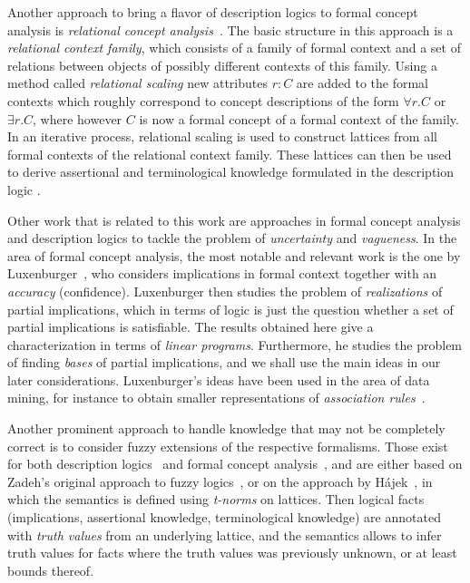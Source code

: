 Another approach to bring a flavor of description logics to formal concept analysis is
\emph{relational concept analysis}~\cite{conf/icfca/RouaneHNV07,
  journals/amai/HaceneHNV13}.  The basic structure in this approach is a \emph{relational
  context family}, which consists of a family of formal context and a set of relations
between objects of possibly different contexts of this family.  Using a method called
\emph{relational scaling} new attributes $r \colon C$ are added to the formal contexts
which roughly correspond to concept descriptions of the form $\forall r. C$ or $\exists
r. C$, where however $C$ is now a formal concept of a formal context of the family.  In an
iterative process, relational scaling is used to construct lattices from all formal
contexts of the relational context family.  These lattices can then be used to derive
assertional and terminological knowledge formulated in the description logic \FLE.

Other work that is related to this work are approaches in formal concept analysis and
description logics to tackle the problem of \emph{uncertainty} and \emph{vagueness}.  In
the area of formal concept analysis, the most notable and relevant work is the one by
Luxenburger~\cite{diss:Luxenburger,Luxenburger91}, who considers implications in formal
context together with an \emph{accuracy} (confidence).  Luxenburger then studies the
problem of \emph{realizations} of partial implications, which in terms of logic is just
the question whether a set of partial implications is satisfiable.  The results obtained
here give a characterization in terms of \emph{linear programs}.  Furthermore, he studies
the problem of finding \emph{bases} of partial implications, and we shall use the main
ideas in our later considerations.  Luxenburger's ideas have been used in the area of data
mining, for instance to obtain smaller representations of \emph{association
  rules}~\cite{DBLP:conf/ki/StummeTBPL01}.

Another prominent approach to handle knowledge that may not be completely correct is to
consider fuzzy extensions of the respective formalisms.  Those exist for both description
logics~\cite{DBLP:journals/jair/Straccia01,journals/fss/BobilloS09} and formal concept
analysis~\cite{conf/cla/BelohlavekV05}, and are either based on Zadeh's original approach
to fuzzy logics~\cite{journals/iandc/Zadeh65}, or on the approach by
Hájek~\cite{hajek1998metamathematics}, in which the semantics is defined using
\emph{t-norms} on lattices.  Then logical facts (implications, assertional knowledge,
terminological knowledge) are annotated with \emph{truth values} from an underlying
lattice, and the semantics allows to infer truth values for facts where the truth values
was previously unknown, or at least bounds thereof.

